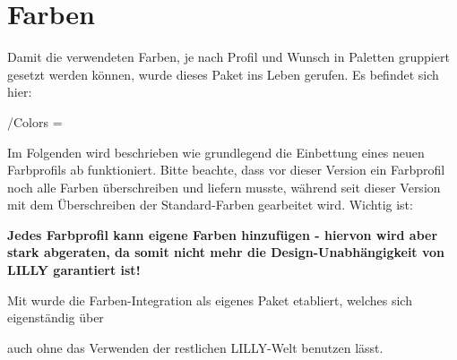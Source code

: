 \chapter[Farben \LILLYxBOXxVersion{\small 1.0.4}]{Farben}
\bigskip\newline
{}Damit die verwendeten Farben, je nach Profil und Wunsch in Paletten gruppiert gesetzt werden können, wurde dieses Paket ins Leben gerufen. Es befindet sich hier:\begin{center}
    /Colors = 
\end{center}
Im Folgenden wird beschrieben wie grundlegend die Einbettung eines neuen Farbprofils ab  funktioniert. Bitte beachte, dass vor dieser Version ein Farbprofil noch alle Farben überschreiben und liefern musste, während seit dieser Version mit dem Überschreiben der Standard-Farben gearbeitet wird. Wichtig ist:\begin{center}
    \small\bfseries Jedes Farbprofil kann eigene Farben hinzufügen - hiervon wird aber stark abgeraten, da somit nicht mehr die Design-Unabhängigkeit von LILLY garantiert ist!
\end{center}
\begin{bemerkung}
    Mit  wurde die Farben-Integration als eigenes Paket  etabliert, welches sich eigenständig über \begin{latex}
\usepackage{LILLYxCOLOR}
        \end{latex}
        auch ohne das Verwenden der restlichen LILLY-Welt benutzen lässt.
\end{bemerkung}
